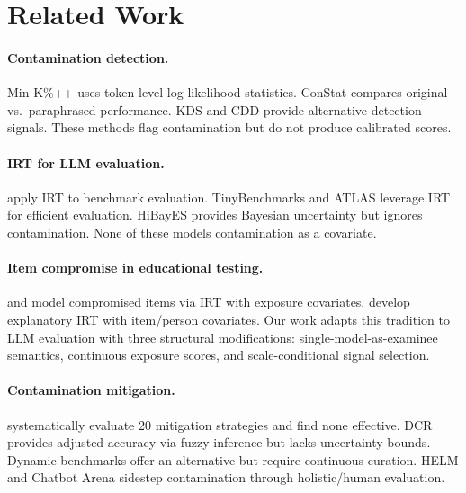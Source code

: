\documentclass[11pt,a4paper]{article}
\begin{document}
\section{Related Work}

\paragraph{Contamination detection.}
Min-K\%++ \citep{shi2024detecting} uses token-level log-likelihood statistics.
ConStat \citep{dekoninck2024constat} compares original vs.\ paraphrased performance.
KDS \citep{dong2024generalization} and CDD \citep{deng2024investigating} provide alternative detection signals.
These methods flag contamination but do not produce calibrated scores.

\paragraph{IRT for LLM evaluation.}
\citet{lalor2024benchmarking} apply IRT to benchmark evaluation.
TinyBenchmarks \citep{polo2024tinybenchmarks} and ATLAS \citep{rodriguez2021evaluation} leverage IRT for efficient evaluation.
HiBayES \citep{zhuang2024hibayes} provides Bayesian uncertainty but ignores contamination.
None of these models contamination as a covariate.

\paragraph{Item compromise in educational testing.}
\citet{eckerly2017detecting} and \citet{sinharay2017assessment} model compromised items via IRT with exposure covariates.
\citet{deboeck2004explanatory} develop explanatory IRT with item/person covariates.
Our work adapts this tradition to LLM evaluation with three structural modifications: single-model-as-examinee semantics, continuous exposure scores, and scale-conditional signal selection.

\paragraph{Contamination mitigation.}
\citet{xu2024benchmarking} systematically evaluate 20 mitigation strategies and find none effective.
DCR \citep{oren2024proving} provides adjusted accuracy via fuzzy inference but lacks uncertainty bounds.
Dynamic benchmarks \citep{white2024livebench} offer an alternative but require continuous curation.
HELM \citep{liang2023holistic} and Chatbot Arena \citep{zheng2023judging} sidestep contamination through holistic/human evaluation.
\end{document}
